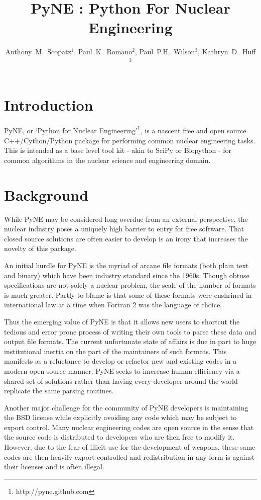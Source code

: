 \documentclass{anstrans}
\title{PyNE : Python For Nuclear Engineering}
\author{Anthony~M.~Scopatz$^1$, Paul~K.~Romano$^2$, Paul~P.H.~Wilson$^3$, Kathryn~D.~Huff$^3$}
\institute{$^1$ University of Chicago, $^2$ Massachusetts Institute of Technology, $^3$ University of Wisconsin }
\date{}
\begin{document}
\section{Introduction}

PyNE, or `Python for Nuclear Engineering'\footnote{http://pyne.github.com}, is a
nascent free and open source C++/Cython/Python package for performing common
nuclear engineering tasks.  This is intended as a base level tool kit - akin to
SciPy or Biopython - for common algorithms in the nuclear science and
engineering domain.

\section{Background}

While PyNE may be considered long overdue from an external perspective, the 
nuclear industry poses a uniquely high barrier to entry for free software.  
That closed source solutions are often easier to develop is an irony that 
increases the novelty of this package.

An initial hurdle for PyNE is the myriad of arcane file formats (both plain text
and binary) which have been industry standard since the 1960s.  Though obtuse 
specifications are not solely a nuclear problem, the scale of the number of formats 
is much greater.  Partly to blame is that some of these formats were enshrined 
in international law at a time when Fortran 2 was the language of choice.

Thus the emerging value of PyNE is that it allows new users to shortcut the tedious and 
error prone process of writing their own tools to parse these data and output file 
formats.  The current unfortunate state of affairs is due in part to huge institutional 
inertia on the part of the maintainers of such formats.  This manifests as a reluctance to 
develop or refactor new and existing codes in a modern open source manner.  PyNE seeks to 
imcrease human efficiency via a shared set of solutions rather than having every developer 
around the world replicate the same parsing routines.

Another major challenge for the community of PyNE developers is maintaining
the BSD license while explicitly avoiding any code which may be subject to 
export control.  Many nuclear engineering codes are open source in the sense
that the source code is distributed to developers who are then free to modify it.
However, due to the fear of illicit use for the development of weapons, these
same codes are then heavily export controlled and redistribution in any form is 
against their licenses and is often illegal.
\end{document}

